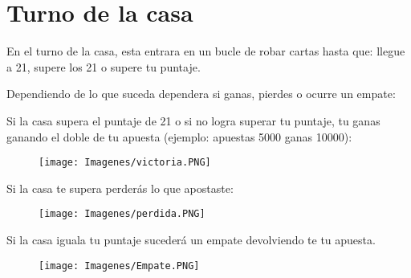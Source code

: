 \section{Turno de la casa}

En el turno de la casa, esta entrara en un bucle de robar cartas hasta que: llegue a 21, supere los 21 o supere tu puntaje.

Dependiendo de lo que suceda dependera si ganas, pierdes o ocurre un empate:

Si la casa supera el puntaje de 21 o si no logra superar tu puntaje, tu ganas ganando el doble de tu apuesta (ejemplo: apuestas 5000 ganas 10000):

\begin{figure}[h]
    \raggedright
    \texttt{[image: Imagenes/victoria.PNG]}
\end{figure}

Si la casa te supera perderás lo que apostaste:

\begin{figure}[h]
    \raggedright
    \texttt{[image: Imagenes/perdida.PNG]}
\end{figure}

Si la casa iguala tu puntaje sucederá un empate devolviendo te tu apuesta.

\begin{figure}[h]
    \raggedright
    \texttt{[image: Imagenes/Empate.PNG]}
\end{figure}

\newpage